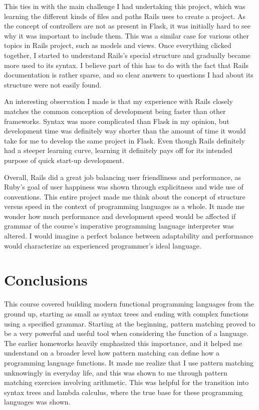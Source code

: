 \documentclass{article}
\theoremstyle{theorem}
\theoremstyle{definition}
\theoremstyle{remark}
\begin{document}
This ties in with the main challenge I had undertaking this project, which was learning the different kinds of files and paths Rails uses to create a project. As the concept of controllers are not as present in Flask, it was initially hard to see why it was important to include them. This was a similar case for various other topics in Rails project, such as models and views. Once everything clicked together, I started to understand Rails's special structure and gradually became more used to its syntax. I believe part of this has to do with the fact that Rails documentation is rather sparse, and so clear answers to questions I had about its structure were not easily found.

An interesting observation I made is that my experience with Rails closely matches the common conception of development being faster than other frameworks. Syntax was more complicated than Flask in my opinion, but development time was definitely way shorter than the amount of time it would take for me to develop the same project in Flask.
Even though Rails definitely had a steeper learning curve, learning it definitely pays off for its intended purpose of quick start-up development.

Overall, Rails did a great job balancing user friendliness and performance, as Ruby's goal of user happiness was shown through explicitness and wide use of conventions. This entire project made me think about the concept of structure versus speed in the context of programming languages as a whole. It made me wonder how much performance and development speed would be affected if grammar of the course's imperative programming language interpreter was altered. I would imagine a perfect balance between adaptability and performance would characterize an experienced programmer's ideal language.

\newpage

\section{Conclusions}\label{conclusions}

This course covered building modern functional programming languages from the ground up, starting as small as syntax trees and ending with complex functions using a specified grammar. Starting at the beginning, pattern matching proved to be a very powerful and useful tool when considering the function of a language. The earlier homeworks heavily emphasized this importance, and it helped me understand on a broader level how pattern matching can define how a programming language functions. It made me realize that I use pattern matching unknowingly in everyday life, and this was shown to me through pattern matching exercises involving arithmetic. This was helpful for the transition into syntax trees and lambda calculus, where the true base for these programming languages was shown. 
\end{document}
